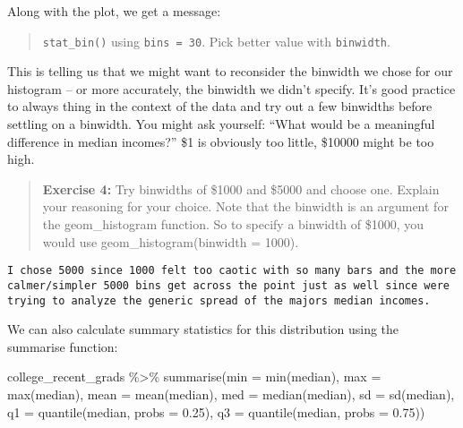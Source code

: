 \documentclass[
]{article}
\newenvironment{Shaded}{\begin{snugshade}}{\end{snugshade}}
\newcommand{\AttributeTok}[1]{\textcolor[rgb]{0.77,0.63,0.00}{#1}}
\newcommand{\FloatTok}[1]{\textcolor[rgb]{0.00,0.00,0.81}{#1}}
\newcommand{\FunctionTok}[1]{\textcolor[rgb]{0.00,0.00,0.00}{#1}}
\newcommand{\NormalTok}[1]{#1}
\newcommand{\SpecialCharTok}[1]{\textcolor[rgb]{0.00,0.00,0.00}{#1}}
\begin{document}
Along with the plot, we get a message:

\begin{quote}
\texttt{stat\_bin()} using \texttt{bins\ =\ 30}. Pick better value with
\texttt{binwidth}.
\end{quote}

This is telling us that we might want to reconsider the binwidth we
chose for our histogram -- or more accurately, the binwidth we didn't
specify. It's good practice to always thing in the context of the data
and try out a few binwidths before settling on a binwidth. You might ask
yourself: ``What would be a meaningful difference in median incomes?''
\$1 is obviously too little, \$10000 might be too high.

\begin{quote}
\textbf{Exercise 4:} Try binwidths of \$1000 and \$5000 and choose one.
Explain your reasoning for your choice. Note that the binwidth is an
argument for the geom\_histogram function. So to specify a binwidth of
\$1000, you would use geom\_histogram(binwidth = 1000).
\end{quote}

\begin{verbatim}
I chose 5000 since 1000 felt too caotic with so many bars and the more calmer/simpler 5000 bins get across the point just as well since were trying to analyze the generic spread of the majors median incomes.
\end{verbatim}

We can also calculate summary statistics for this distribution using the
summarise function:

\begin{Shaded}
\begin{Highlighting}[]
\NormalTok{college\_recent\_grads }\SpecialCharTok{\%\textgreater{}\%}
  \FunctionTok{summarise}\NormalTok{(}\AttributeTok{min =} \FunctionTok{min}\NormalTok{(median), }\AttributeTok{max =} \FunctionTok{max}\NormalTok{(median),}
            \AttributeTok{mean =} \FunctionTok{mean}\NormalTok{(median), }\AttributeTok{med =} \FunctionTok{median}\NormalTok{(median),}
            \AttributeTok{sd =} \FunctionTok{sd}\NormalTok{(median), }
            \AttributeTok{q1 =} \FunctionTok{quantile}\NormalTok{(median, }\AttributeTok{probs =} \FloatTok{0.25}\NormalTok{),}
            \AttributeTok{q3 =} \FunctionTok{quantile}\NormalTok{(median, }\AttributeTok{probs =} \FloatTok{0.75}\NormalTok{))}
\end{Highlighting}
\end{Shaded}
\end{document}
